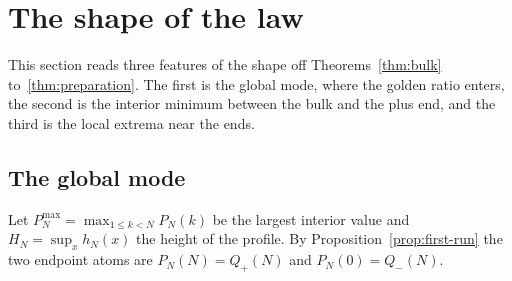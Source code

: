 \section{The shape of the law}\label{sec:shape}

This section reads three features of the shape off Theorems~\ref{thm:bulk}
to~\ref{thm:preparation}. The first is the global mode, where the golden ratio
enters, the second is the interior minimum between the bulk and the plus end, and the
third is the local extrema near the ends.

\subsection{The global mode}\label{sec:mode}

Let $P^{\max}_N=\max_{1\le k<N}P_N(k)$ be the largest interior value and
$H_N=\sup_xh_N(x)$ the height of the profile. By
Proposition~\ref{prop:first-run} the two endpoint atoms are
$P_N(N)=Q_\plus(N)$ and $P_N(0)=Q_\minus(N)$.

